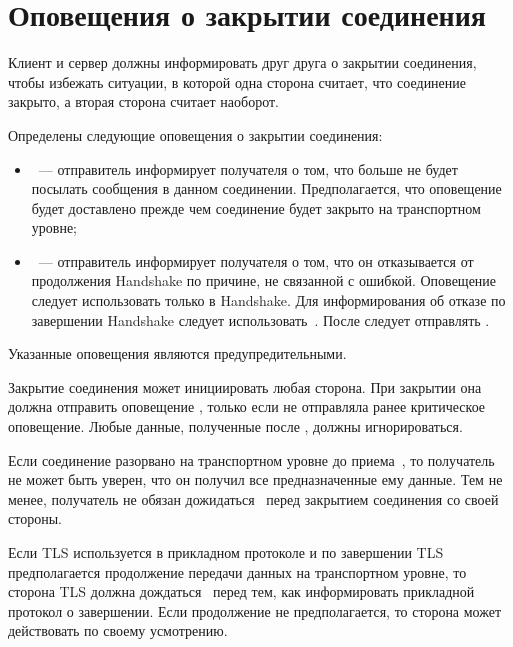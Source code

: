 \section{Оповещения о закрытии соединения}\label{ALERT.Closure}

Клиент и сервер должны информировать друг друга о закрытии соединения, чтобы
избежать ситуации, в которой одна сторона считает, что соединение закрыто, 
а вторая сторона считает наоборот.

Определены следующие оповещения о закрытии соединения:

\begin{itemize}
\item\label{ALERT.Closure.cn}
~--- отправитель информирует получателя о том, что больше не 
будет посылать сообщения в данном соединении. Предполагается, что оповещение
будет доставлено прежде чем соединение будет закрыто на транспортном уровне; 


\item\label{ALERT.Closure.uc}
~--- отправитель информирует получателя о том, что он 
отказывается от продолжения Handshake по причине, не связанной с ошибкой.
%
Оповещение  следует использовать только в Handshake. 
Для информирования об отказе по завершении Handshake следует 
использовать~.
%
После  следует отправлять .
\end{itemize}

Указанные оповещения являются предупредительными. 


Закрытие соединения может инициировать любая сторона. При закрытии она должна 
отправить оповещение , только если не 
отправляла ранее критическое оповещение.
%
Любые данные, полученные после , должны 
игнорироваться.

Если соединение разорвано на транспортном уровне до 
приема~, то получатель не может быть 
уверен, что он получил все предназначенные ему данные. Тем не менее, получатель 
не обязан дожидаться~ перед закрытием 
соединения со своей стороны.

Если TLS используется в прикладном протоколе и по завершении TLS предполагается 
продолжение передачи данных на транспортном уровне, то сторона TLS должна  
дождаться~ перед тем, как информировать 
прикладной протокол о завершении. Если продолжение не предполагается, то 
сторона может действовать по своему усмотрению.
